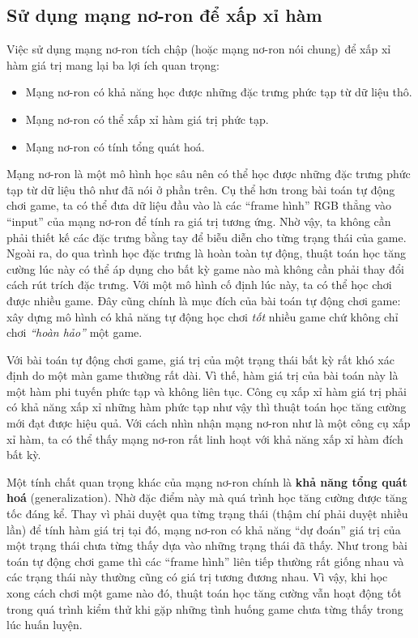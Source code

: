 \subsection{Sử dụng mạng nơ-ron để xấp xỉ hàm}
	Việc sử dụng mạng nơ-ron tích chập (hoặc mạng nơ-ron nói chung) để xấp xỉ hàm giá trị mang lại ba lợi ích quan trọng:
	\begin{itemize}
		\item Mạng nơ-ron có khả năng học được những đặc trưng phức tạp từ dữ liệu thô.
		\item Mạng nơ-ron có thể xấp xỉ hàm giá trị phức tạp.
		\item Mạng nơ-ron có tính tổng quát hoá.
	\end{itemize}
	
	Mạng nơ-ron là một mô hình học sâu nên có thể học được những đặc trưng phức tạp từ dữ liệu thô như đã nói ở phần trên.
	Cụ thể hơn trong bài toán tự động chơi game, ta có thể đưa dữ liệu đầu vào là các ``frame hình'' RGB thẳng vào ``input'' của mạng nơ-ron để tính ra giá trị tương ứng.
	Nhờ vậy, ta không cần phải thiết kế các đặc trưng bằng tay để biễu diễn cho từng trạng thái của game.
	Ngoài ra, do qua trình học đặc trưng là hoàn toàn tự động, thuật toán học tăng cường lúc này có thể áp dụng cho bất kỳ game nào mà không cần phải thay đổi cách rút trích đặc trưng.
	Với một mô hình cố định lúc này, ta có thể học chơi được nhiều game.
	Đây cũng chính là mục đích của bài toán tự động chơi game: xây dựng mô hình có khả năng tự động học chơi \textit{tốt} nhiều game chứ không chỉ chơi \textit{``hoàn hảo''} một game.
	
	Với bài toán tự động chơi game, giá trị của một trạng thái bất kỳ rất khó xác định do một màn game thường rất dài.
	Vì thế, hàm giá trị của bài toán này là một hàm phi tuyến phức tạp và không liên tục.
	Công cụ xấp xỉ hàm giá trị phải có khả năng xấp xỉ những hàm phức tạp như vậy thì thuật toán học tăng cường mới đạt được hiệu quả.
	Với cách nhìn nhận mạng nơ-ron như là một công cụ xấp xỉ hàm, ta có thể thấy mạng nơ-ron rất linh hoạt với khả năng xấp xỉ hàm đích bất kỳ.
	
	Một tính chất quan trọng khác của mạng nơ-ron chính là \textbf{khả năng tổng quát hoá} (generalization).
	Nhờ đặc điểm này mà quá trình học tăng cường được tăng tốc đáng kể.
	Thay vì phải duyệt qua từng trạng thái (thậm chí phải duyệt nhiều lần) để tính hàm giá trị tại đó, mạng nơ-ron có khả năng ``dự đoán'' giá trị của một trạng thái chưa từng thấy dựa vào những trạng thái đã thấy.
	Như trong bài toán tự động chơi game thì các ``frame hình'' liên tiếp thường rất giống nhau và các trạng thái này thường cũng có giá trị tương đương nhau.
	Vì vậy, khi học xong cách chơi một game nào đó, thuật toán học tăng cường vẫn hoạt động tốt trong quá trình kiểm thử khi gặp những tình huống game chưa từng thấy trong lúc huấn luyện.
	
